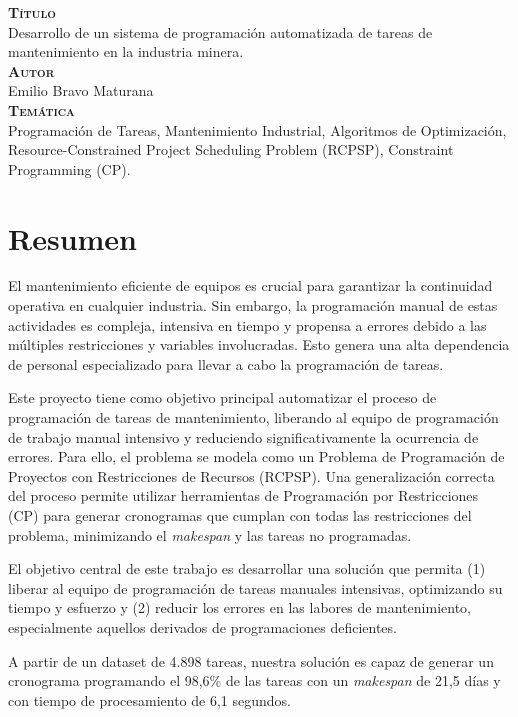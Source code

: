 \documentclass{article}
\begin{document}
{\bfseries\scshape Título}\\[.25cm]
Desarrollo de un sistema de programación automatizada de tareas de mantenimiento en la industria minera.\\


{\bfseries\scshape Autor}\\[.25cm]
Emilio Bravo Maturana\\

{\bfseries\scshape Temática}\\[.25cm]
Programación de Tareas, Mantenimiento Industrial, Algoritmos de Optimización, Resource-Constrained Project Scheduling Problem (RCPSP), Constraint Programming (CP).

\newpage

\section*{Resumen}
El mantenimiento eficiente de equipos es crucial para garantizar la continuidad operativa en cualquier industria. Sin embargo, la programación manual de estas actividades es compleja, intensiva en tiempo y propensa a errores debido a las múltiples restricciones y variables involucradas. Esto genera una alta dependencia de personal especializado para llevar a cabo la programación de tareas.

Este proyecto tiene como objetivo principal automatizar el proceso de programación de tareas de mantenimiento, liberando al equipo de programación de trabajo manual intensivo y reduciendo significativamente la ocurrencia de errores. Para ello, el problema se modela como un Problema de Programación de Proyectos con Restricciones de Recursos (RCPSP). Una generalización correcta del proceso permite utilizar herramientas de Programación por Restricciones (CP) para generar cronogramas que cumplan con todas las restricciones del problema, minimizando el \textit{makespan} y las tareas no programadas.

El objetivo central de este trabajo es desarrollar una solución que permita (1) liberar al equipo de programación de tareas manuales intensivas, optimizando su tiempo y esfuerzo y (2) reducir los errores en las labores de mantenimiento, especialmente aquellos derivados de programaciones deficientes.

A partir de un dataset de 4.898 tareas, nuestra solución es capaz de generar un cronograma programando el 98,6\% de las tareas con un \textit{makespan} de 21,5 días y con tiempo de procesamiento de 6,1 segundos.
\newpage
\end{document}
